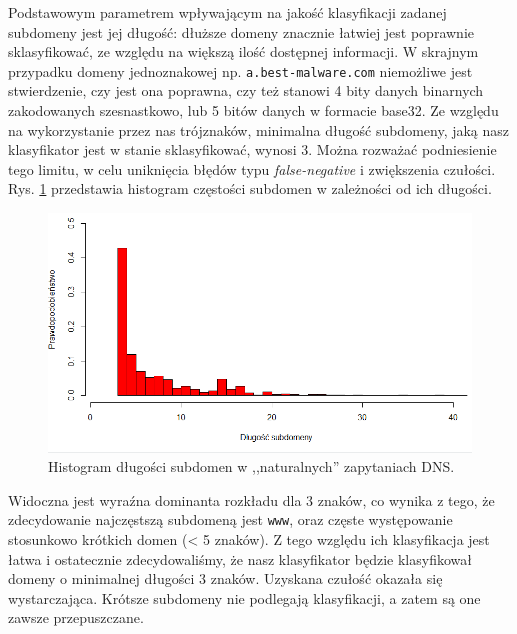 \documentclass{eiti-raport}
\begin{document}
Podstawowym parametrem wpływającym na jakość klasyfikacji zadanej subdomeny jest jej długość: dłuższe domeny znacznie łatwiej jest poprawnie sklasyfikować, ze względu na większą ilość dostępnej informacji. W skrajnym przypadku domeny jednoznakowej np. \texttt{a.best-malware.com} niemożliwe jest stwierdzenie, czy jest ona poprawna, czy też stanowi 4 bity danych binarnych zakodowanych szesnastkowo, lub 5 bitów danych w formacie base32. Ze względu na wykorzystanie przez nas trójznaków, minimalna długość subdomeny, jaką nasz klasyfikator jest w stanie sklasyfikować, wynosi 3. Można rozważać podniesienie tego limitu, w celu uniknięcia błędów typu \emph{false-negative} i zwiększenia czułości. Rys. \ref{fig:length-hist} przedstawia histogram częstości subdomen w zależności od ich długości. 
\begin{figure}[!h] \centering
	\includegraphics[width=0.9\linewidth]{img/length-hist.PNG}
	\caption{Histogram długości subdomen w ,,naturalnych'' zapytaniach DNS.} \label{fig:length-hist}
\end{figure}
Widoczna jest wyraźna dominanta rozkładu dla 3 znaków, co wynika z tego, że zdecydowanie najczęstszą subdomeną jest \texttt{www}, oraz częste występowanie stosunkowo krótkich domen (< 5 znaków). Z tego względu ich klasyfikacja jest łatwa i ostatecznie zdecydowaliśmy, że nasz klasyfikator będzie klasyfikował domeny o minimalnej długości 3 znaków. Uzyskana czułość okazała się wystarczająca. Krótsze subdomeny nie podlegają klasyfikacji, a zatem są one zawsze przepuszczane. 
\end{document}
